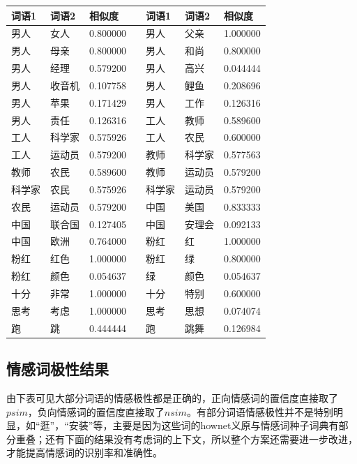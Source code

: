 \documentclass[11pt,a4paper]{article}
\begin{document}
\begin{center}
{\scriptsize\begin{tabular}{|l|l|l|c|l|l|l|}
\hline
词语1 & 词语2 & 相似度 && 词语1 & 词语2 & 相似度 \\
\hline
男人 & 女人 & 0.800000 && 男人 & 父亲 & 1.000000 \\
\hline
男人 & 母亲 & 0.800000 && 男人 & 和尚 & 0.800000 \\
\hline
男人 & 经理 & 0.579200 && 男人 & 高兴 & 0.044444 \\
\hline
男人 & 收音机 & 0.107758 && 男人 & 鲤鱼 & 0.208696 \\
\hline
男人 & 苹果 & 0.171429 && 男人 & 工作 & 0.126316 \\
\hline
男人 & 责任 & 0.126316 && 工人 & 教师 & 0.589600 \\
\hline
工人 & 科学家 & 0.575926 && 工人 & 农民 & 0.600000 \\
\hline
工人 & 运动员 & 0.579200 && 教师 & 科学家 & 0.577563 \\
\hline
教师 & 农民 & 0.589600 && 教师 & 运动员 & 0.579200 \\
\hline
科学家 & 农民 & 0.575926 && 科学家 & 运动员 & 0.579200 \\
\hline
农民 & 运动员 & 0.579200 && 中国 & 美国 & 0.833333 \\
\hline
中国 & 联合国 & 0.127405 && 中国 & 安理会 & 0.092133 \\
\hline
中国 & 欧洲 & 0.764000 && 粉红 & 红 & 1.000000 \\
\hline
粉红 & 红色 & 1.000000 && 粉红 & 绿 & 0.800000 \\
\hline
粉红 & 颜色 & 0.054637 && 绿 & 颜色 & 0.054637 \\
\hline
十分 & 非常 & 1.000000 && 十分 & 特别 & 0.600000 \\
\hline 
思考 & 考虑 & 1.000000 && 思考 & 思想 & 0.074074 \\
\hline
跑 & 跳 & 0.444444 && 跑 & 跳舞 & 0.126984 \\
\hline
\end{tabular}}
\end{center}


\subsection{情感词极性结果}

由下表可见大部分词语的情感极性都是正确的，正向情感词的置信度直接取了$psim$，负向情感词的置信度直接取了$nsim$。有部分词语情感极性并不是特别明显，如“逛”，“安装”等，主要是因为这些词的hownet义原与情感词种子词典有部分重叠；还有下面的结果没有考虑词的上下文，所以整个方案还需要进一步改进，才能提高情感词的识别率和准确性。
\end{document}
